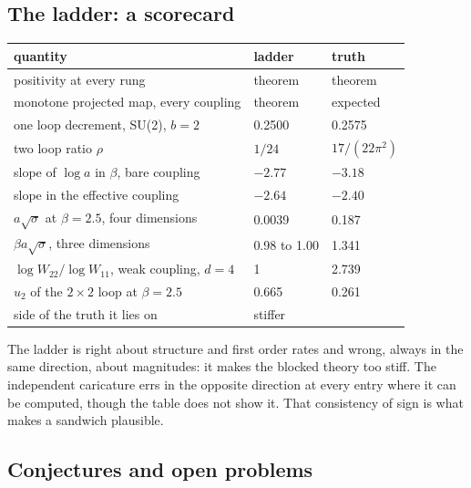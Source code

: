 \subsection{The ladder: a scorecard}

\begin{center}
\small
\begin{tabular}{p{2.35in}p{0.8in}p{0.8in}}
\toprule
quantity & ladder & truth \\ \midrule
positivity at every rung & theorem & theorem \\
monotone projected map, every coupling & theorem & expected \\
one loop decrement, SU(2), $b=2$ & 0.2500 & 0.2575 \\
two loop ratio $\rho$ & $1/24$ & $17/(22\pi^2)$ \\
slope of $\log a$ in $\beta$, bare coupling & $-2.77$ & $-3.18$ \\
slope in the effective coupling & $-2.64$ & $-2.40$ \\
$a\sqrt\sigma$ at $\beta=2.5$, four dimensions & 0.0039 & 0.187 \\
$\beta a\sqrt\sigma$, three dimensions & 0.98 to 1.00 & 1.341 \\
$\log W_{22}/\log W_{11}$, weak coupling, $d=4$ & 1 & 2.739 \\
$u_2$ of the $2\times2$ loop at $\beta=2.5$ & 0.665 & 0.261 \\
side of the truth it lies on & stiffer & \\
\bottomrule
\end{tabular}
\end{center}

The ladder is right about structure and first order rates and wrong, always in the same direction, about magnitudes: it makes the blocked theory too stiff. The independent caricature errs in the opposite direction at every entry where it can be computed, though the table does not show it. That consistency of sign is what makes a sandwich plausible.

\subsection{Conjectures and open problems}


